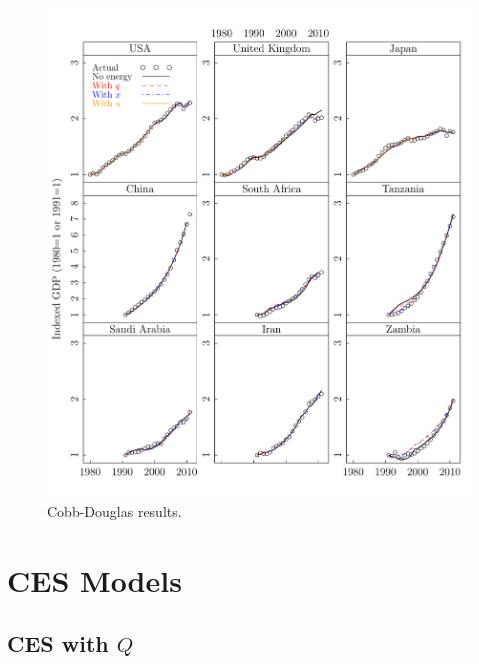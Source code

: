 \documentclass[preprint,authoryear,12pt]{elsarticle}\usepackage{graphicx, color}
\makeatletter
\def\maxwidth{ %
  \ifdim\Gin@nat@width>\linewidth
    \linewidth
  \else
    \Gin@nat@width
  \fi
}
\newenvironment{knitrout}{}{} %
\makeatother
\begin{document}
\begin{knitrout}
\color{fgcolor}\begin{figure}[H]

\includegraphics[width=\maxwidth]{figure/CD_GDP_Lattice_Graph} \caption[Cobb-Douglas results]{Cobb-Douglas results.\label{fig:CD_GDP_Lattice_Graph}}
\end{figure}


\end{knitrout}


\section{CES Models}




\subsection{CES with $Q$}
\end{document}
